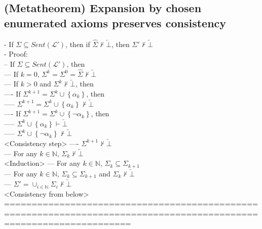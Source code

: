 \documentclass{book}
\newcommand{\inot}{\not}
\newcommand{\contr}{\overleftarrow{\bot}}
\newcommand{\set}[1]{\left\{ #1 \right\}}
\begin{document}
\subsection{(Metatheorem) Expansion by chosen enumerated axioms preserves consistency} %
	- If $\Sigma \subseteq Sent(\mathcal{L}')$, then if $\hat{\Sigma} \inot \vdash \contr$, then $\Sigma' \inot \vdash \contr$ \\
	- Proof: \\
		-- If $\Sigma \subseteq Sent(\mathcal{L}')$, then \\
			--- If $k = 0$, $\Sigma^k = \Sigma^0 = \hat{\Sigma} \inot \vdash \contr$ \\
			--- If $k > 0$ and $\Sigma^k \inot \vdash \contr$, then \\
				---- If $\Sigma^{k+1} = \Sigma^k \cup \set{\alpha_k}$, then \\
					----- $\Sigma^{k+1} = \Sigma^k \cup \set{\alpha_k} \inot \vdash \contr$ \\
				---- If $\Sigma^{k+1} = \Sigma^k \cup \set{\lnot \alpha_k}$, then \\
					----- $\Sigma^k \cup \set{\alpha_k} \vdash \contr$ \\
					----- $\Sigma^k \cup \set{\lnot \alpha_k} \inot \vdash \contr$ \\ <Consistency step>
				---- $\Sigma^{k+1} \inot \vdash \contr$ \\
			--- For any $k \in \mathbb{N}$, $\Sigma_k \inot \vdash \contr$ \\ <Induction>
			--- For any $k \in \mathbb{N}$, $\Sigma_k \subseteq \Sigma_{k+1}$ \\
			--- For any $k \in \mathbb{N}$, $\Sigma_k \subseteq \Sigma_{k+1}$ and $\Sigma_k \inot \vdash \contr$ \\
			--- $\Sigma' = \cup_{i \in \mathbb{N}} \Sigma_i \inot \vdash \contr$ \\ <Consistency from below>
	===================================================================================================================
\end{document}
